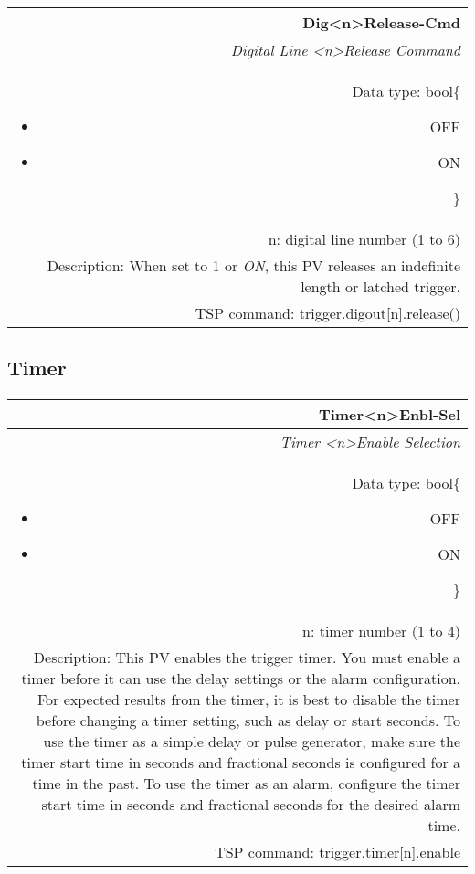 \documentclass[openany]{article}
\begin{document}
		\begin{tabular}{N}
			\hline
			\bfseries Dig{\textless n\textgreater}Release-Cmd\label{pv:digrelease-cmd} \\ \hline
			\emph{Digital Line \textless n\textgreater Release Command} \\
			Data type: bool\{\begin{itemize}[noitemsep]
				\small
				\item[] OFF
				\item[] ON
			\end{itemize}\} \\
			n: digital line number (1 to 6) \\
			Description: When set to 1 or \emph{ON}, this PV releases an indefinite length or latched trigger. \\
			TSP command: trigger.digout[n].release()
		\end{tabular}

	\subsection{Timer}\label{pvgroup:timer}

		\paragraph{} %

		\begin{tabular}{N}
			\hline
			\bfseries Timer{\textless n\textgreater}Enbl-Sel\label{pv:timerenbl-sel} \\ \hline
			\emph{Timer \textless n\textgreater Enable Selection} \\
			Data type: bool\{\begin{itemize}[noitemsep]
				\small
				\item[] OFF
				\item[] ON
			\end{itemize}\} \\
			n: timer number (1 to 4) \\
			Description: This PV enables the trigger timer. You must enable a timer before it can use the delay settings or the alarm configuration. For expected results from the timer, it is best to disable the timer before changing a timer setting, such as delay or start seconds. To use the timer as a simple delay or pulse generator, make sure the timer start time in seconds and fractional seconds is configured for a time in the past. To use the timer as an alarm, configure the timer start time in seconds and fractional seconds for the desired alarm time.\\
			TSP command: trigger.timer[n].enable
		\end{tabular}
\end{document}
